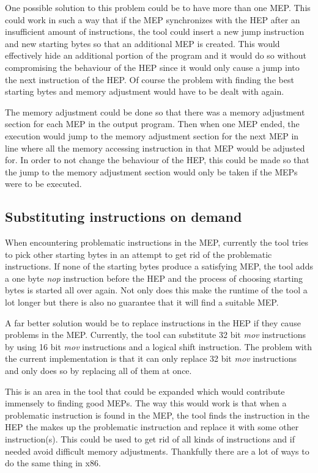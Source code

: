 \documentclass[11pt,twoside]{eitExjobb}
\begin{document}
One possible solution to this problem could be to have more than one MEP. This could work in such a way that if the MEP synchronizes with the HEP after an insufficient amount of instructions, the tool could insert a new jump instruction and new starting bytes so that an additional MEP is created. This would effectively hide an additional portion of the program and it would do so without compromising the behaviour of the HEP since it would only cause a jump into the next instruction of the HEP. Of course the problem with finding the best starting bytes and memory adjustment would have to be dealt with again.

The memory adjustment could be done so that there was a memory adjustment section for each MEP in the output program. Then when one MEP ended, the execution would jump to the memory adjustment section for the next MEP in line where all the memory accessing instruction in that MEP would be adjusted for. In order to not change the behaviour of the HEP, this could be made so that the jump to the memory adjustment section would only be taken if the MEPs were to be executed. 

\subsection{Substituting instructions on demand}
When encountering problematic instructions in the MEP, currently the tool tries to pick other starting bytes in an attempt to get rid of the problematic instructions. If none of the starting bytes produce a satisfying MEP, the tool adds a one byte \emph{nop} instruction before the HEP and the process of choosing starting bytes is started all over again. Not only does this make the runtime of the tool a lot longer but there is also no guarantee that it will find a suitable MEP.

A far better solution would be to replace instructions in the HEP if they cause problems in the MEP. Currently, the tool can substitute 32 bit \emph{mov} instructions by using 16 bit \emph{mov} instructions and a logical shift instruction. The problem with the current implementation is that it can only replace 32 bit \emph{mov} instructions and only does so by replacing all of them at once.

This is an area in the tool that could be expanded which would contribute immensely to finding good MEPs. The way this would work is that when a problematic instruction is found in the MEP, the tool finds the instruction in the HEP the makes up the problematic instruction and replace it with some other instruction(s). This could be used to get rid of all kinds of instructions and if needed avoid difficult memory adjustments. Thankfully there are a lot of ways to do the same thing in x86. 
\end{document}
